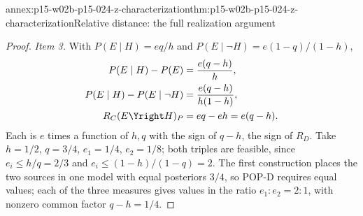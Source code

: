 \begin{annexitem}{annex:p15-w02b-p15-024-z-characterization}{thm:p15-w02b-p15-024-z-characterization}{Relative distance: the full realization argument}
\begin{proof}
\emph{Item 3.} With \(P(E\mid H)=eq/h\) and
\(P(E\mid\neg H)=e(1-q)/(1-h)\),
\[
 \begin{aligned}
 P(E\mid H)-P(E)&=\frac{e(q-h)}{h},\\
 P(E\mid H)-P(E\mid\neg H)&=\frac{e(q-h)}{h(1-h)},\\
 R_C(E\Yright H)_P&=eq-eh=e(q-h).
 \end{aligned}
\]
Each is \(e\) times a function of \(h,q\) with the sign of \(q-h\), the
sign of \(R_D\). Take \(h=1/2\), \(q=3/4\), \(e_1=1/4\), \(e_2=1/8\);
both triples are feasible, since \(e_i\leq h/q=2/3\) and
\(e_i\leq(1-h)/(1-q)=2\). The first construction places the two
sources in one model with equal posteriors \(3/4\), so POP-D requires
equal values; each of the three measures gives values in the ratio
\(e_1:e_2=2:1\), with nonzero common factor \(q-h=1/4\).
\end{proof}
\end{annexitem}

